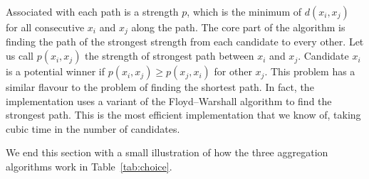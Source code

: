 \documentclass[fleqn,10pt,lineno]{wlpeerj} %
\begin{document}
Associated with each path is a strength $p$, which is the minimum of $d(x_i,
x_j)$ for all consecutive $x_i$ and $x_j$ along the path. The core part of the
algorithm is finding the path of the strongest strength from each candidate to
every other. Let us call $p(x_i, x_j)$ the strength of strongest path between
$x_i$ and $x_j$. Candidate $x_i$ is a potential winner if $p(x_i, x_j) \geq
p(x_j, x_i)$ for other $x_j$. This problem has a similar flavour to the problem
of finding the shortest path. In fact, the implementation uses a variant of the
Floyd–Warshall algorithm to find the strongest path. This is the most efficient
implementation that we know of, taking cubic time in the number of candidates.

We end this section with a small illustration of how the three aggregation
algorithms work in Table~\ref{tab:choice}.
\end{document}
